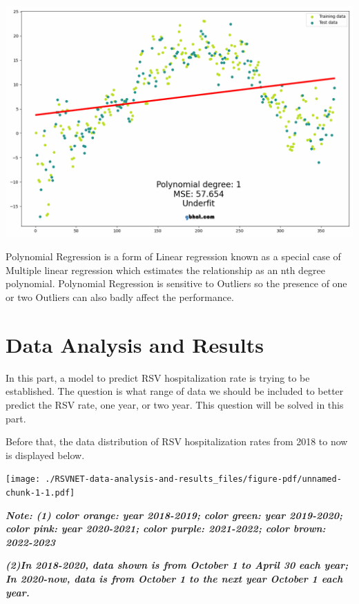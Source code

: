 \documentclass[
  letterpaper,
  DIV=11,
  numbers=noendperiod]{scrreport}
\begin{document}
\includegraphics{./images/polynomial_regression_fit.gif}

Polynomial Regression is a form of Linear regression known as a special
case of Multiple linear regression which estimates the relationship as
an nth degree polynomial. Polynomial Regression is sensitive to Outliers
so the presence of one or two Outliers can also badly affect the
performance.


\hypertarget{data-analysis-and-results}{%
\chapter{Data Analysis and Results}\label{data-analysis-and-results}}

In this part, a model to predict RSV hospitalization rate is trying to
be established. The question is what range of data we should be included
to better predict the RSV rate, one year, or two year. This question
will be solved in this part.

Before that, the data distribution of RSV hospitalization rates from
2018 to now is displayed below.

\texttt{[image: ./RSVNET-data-analysis-and-results\_files/figure-pdf/unnamed-chunk-1-1.pdf]}

\textbf{\emph{Note: (1) color orange: year 2018-2019; color green: year
2019-2020; color pink: year 2020-2021; color purple: 2021-2022; color
brown: 2022-2023}}

\textbf{\emph{(2)In 2018-2020, data shown is from October 1 to April 30
each year; In 2020-now, data is from October 1 to the next year October
1 each year.}}
\end{document}
